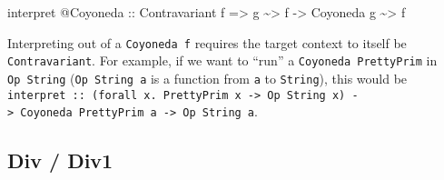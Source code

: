 \documentclass[]{article}
\newenvironment{Shaded}{}{}
\newcommand{\DataTypeTok}[1]{\textcolor[rgb]{0.56,0.13,0.00}{#1}}
\newcommand{\NormalTok}[1]{#1}
\newcommand{\OperatorTok}[1]{\textcolor[rgb]{0.40,0.40,0.40}{#1}}
\newcommand{\OtherTok}[1]{\textcolor[rgb]{0.00,0.44,0.13}{#1}}
\begin{document}
\begin{itemize}
\begin{Shaded}
\begin{Highlighting}[]
\NormalTok{interpret }\OperatorTok{@}\DataTypeTok{Coyoneda}
\OtherTok{    ::} \DataTypeTok{Contravariant}\NormalTok{ f}
    \OtherTok{=>}\NormalTok{ g }\OperatorTok{\textasciitilde{}>}\NormalTok{ f}
    \OtherTok{{-}>} \DataTypeTok{Coyoneda}\NormalTok{ g }\OperatorTok{\textasciitilde{}>}\NormalTok{ f}
\end{Highlighting}
\end{Shaded}

  Interpreting out of a \texttt{Coyoneda\ f} requires the target context to
  itself be \texttt{Contravariant}. For example, if we want to ``run'' a
  \texttt{Coyoneda\ PrettyPrim} in \texttt{Op\ String} (\texttt{Op\ String\ a}
  is a function from \texttt{a} to \texttt{String}), this would be
  \texttt{interpret\ ::\ (forall\ x.\ PrettyPrim\ x\ -\textgreater{}\ Op\ String\ x)\ -\textgreater{}\ Coyoneda\ PrettyPrim\ a\ -\textgreater{}\ Op\ String\ a}.
\end{itemize}

\hypertarget{div-div1}{%
\subsection{Div / Div1}\label{div-div1}}
\end{document}
